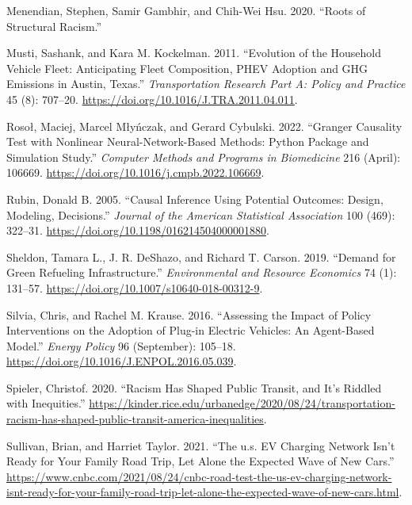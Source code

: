 \documentclass[
  letterpaper,
  DIV=11,
  numbers=noendperiod]{scrartcl}
\newlength{\cslhangindent}
\newlength{\cslentryspacingunit} %
\newenvironment{CSLReferences}[2] %
 {%
  \setlength{\parindent}{0pt}
  \ifodd #1
  \let\oldpar\par
  \def\par{\hangindent=\cslhangindent\oldpar}
  \fi
  \setlength{\parskip}{#2\cslentryspacingunit}
 }%
 {}
\begin{document}
\begin{CSLReferences}{1}{0}
\leavevmode{}%
Menendian, Stephen, Samir Gambhir, and Chih-Wei Hsu. 2020. {``Roots of
Structural Racism.''}

\leavevmode{}%
Musti, Sashank, and Kara M. Kockelman. 2011. {``Evolution of the
Household Vehicle Fleet: Anticipating Fleet Composition, PHEV Adoption
and GHG Emissions in Austin, Texas.''} \emph{Transportation Research
Part A: Policy and Practice} 45 (8): 707--20.
\url{https://doi.org/10.1016/J.TRA.2011.04.011}.

\leavevmode{}%
Rosoł, Maciej, Marcel Młyńczak, and Gerard Cybulski. 2022. {``Granger
Causality Test with Nonlinear Neural-Network-Based Methods: Python
Package and Simulation Study.''} \emph{Computer Methods and Programs in
Biomedicine} 216 (April): 106669.
\url{https://doi.org/10.1016/j.cmpb.2022.106669}.

\leavevmode{}%
Rubin, Donald B. 2005. {``Causal Inference Using Potential Outcomes:
Design, Modeling, Decisions.''} \emph{Journal of the American
Statistical Association} 100 (469): 322--31.
\url{https://doi.org/10.1198/016214504000001880}.

\leavevmode{}%
Sheldon, Tamara L., J. R. DeShazo, and Richard T. Carson. 2019.
{``Demand for Green Refueling Infrastructure.''} \emph{Environmental and
Resource Economics} 74 (1): 131--57.
\url{https://doi.org/10.1007/s10640-018-00312-9}.

\leavevmode{}%
Silvia, Chris, and Rachel M. Krause. 2016. {``Assessing the Impact of
Policy Interventions on the Adoption of Plug-in Electric Vehicles: An
Agent-Based Model.''} \emph{Energy Policy} 96 (September): 105--18.
\url{https://doi.org/10.1016/J.ENPOL.2016.05.039}.

\leavevmode{}%
Spieler, Christof. 2020. {``Racism Has Shaped Public Transit, and It{'}s
Riddled with Inequities.''}
\url{https://kinder.rice.edu/urbanedge/2020/08/24/transportation-racism-has-shaped-public-transit-america-inequalities}.

\leavevmode{}%
Sullivan, Brian, and Harriet Taylor. 2021. {``The u.s. EV Charging
Network Isn't Ready for Your Family Road Trip, Let Alone the Expected
Wave of New Cars.''}
\url{https://www.cnbc.com/2021/08/24/cnbc-road-test-the-us-ev-charging-network-isnt-ready-for-your-family-road-trip-let-alone-the-expected-wave-of-new-cars.html}.


\end{CSLReferences}
\end{document}
